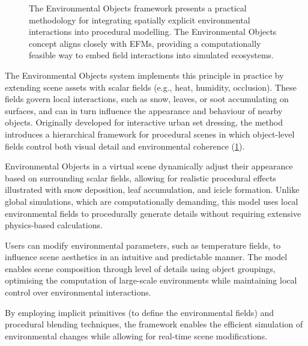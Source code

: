 \begin{figure}
    \caption{The Environmental Objects framework \cite{Grosbellet2016} presents a practical methodology for integrating spatially explicit environmental interactions into procedural modelling. The Environmental Objects concept aligns closely with EFMs, providing a computationally feasible way to embed field interactions into simulated ecosystems.}
    \label{fig:env-obj-teaser-grosbellet2016}
\end{figure}

The Environmental Objects system \cite{Grosbellet2016} implements this principle in practice by extending scene assets with scalar fields (e.g., heat, humidity, occlusion). These fields govern local interactions, such as snow, leaves, or soot accumulating on surfaces, and can in turn influence the appearance and behaviour of nearby objects. Originally developed for interactive urban set dressing, the method introduces a hierarchical framework for procedural scenes in which object-level fields control both visual detail and environmental coherence (\cref{fig:env-obj-teaser-grosbellet2016}).

\begin{Itemize}
    \Item{} Environmental Objects in a virtual scene dynamically adjust their appearance based on surrounding scalar fields, allowing for realistic procedural effects illustrated with snow deposition, leaf accumulation, and icicle formation. Unlike global simulations, which are computationally demanding, this model uses local environmental fields to procedurally generate details without requiring extensive physics-based calculations.

    \Item{} Users can modify environmental parameters, such as temperature fields, to influence scene aesthetics in an intuitive and predictable manner. The model enables scene composition through level of details using object groupings, optimising the computation of large-scale environments while maintaining local control over environmental interactions.
\end{Itemize}
By employing implicit primitives (to define the environmental fields) and procedural blending techniques, the framework enables the efficient simulation of environmental changes while allowing for real-time scene modifications.

